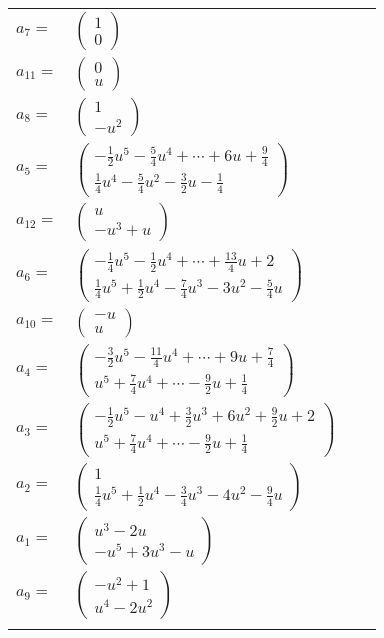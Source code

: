 \documentclass[1p]{elsarticle_modified}
\theoremstyle{definition}
\begin{document}
\begin{tabular}{m{7pt} m{180pt} m{7pt} m{180pt} }
\flushright $a_{7}=$&$\begin{pmatrix}1\\0\end{pmatrix}$ \\
\flushright $a_{11}=$&$\begin{pmatrix}0\\u\end{pmatrix}$ \\
\flushright $a_{8}=$&$\begin{pmatrix}1\\- u^2\end{pmatrix}$ \\
\flushright $a_{5}=$&$\begin{pmatrix}-\frac{1}{2} u^5-\frac{5}{4} u^4+\cdots+6 u+\frac{9}{4}\\\frac{1}{4} u^4-\frac{5}{4} u^2-\frac{3}{2} u-\frac{1}{4}\end{pmatrix}$ \\
\flushright $a_{12}=$&$\begin{pmatrix}u\\- u^3+u\end{pmatrix}$ \\
\flushright $a_{6}=$&$\begin{pmatrix}-\frac{1}{4} u^5-\frac{1}{2} u^4+\cdots+\frac{13}{4} u+2\\\frac{1}{4} u^5+\frac{1}{2} u^4-\frac{7}{4} u^3-3 u^2-\frac{5}{4} u\end{pmatrix}$ \\
\flushright $a_{10}=$&$\begin{pmatrix}- u\\u\end{pmatrix}$ \\
\flushright $a_{4}=$&$\begin{pmatrix}-\frac{3}{2} u^5-\frac{11}{4} u^4+\cdots+9 u+\frac{7}{4}\\u^5+\frac{7}{4} u^4+\cdots-\frac{9}{2} u+\frac{1}{4}\end{pmatrix}$ \\
\flushright $a_{3}=$&$\begin{pmatrix}-\frac{1}{2} u^5- u^4+\frac{3}{2} u^3+6 u^2+\frac{9}{2} u+2\\u^5+\frac{7}{4} u^4+\cdots-\frac{9}{2} u+\frac{1}{4}\end{pmatrix}$ \\
\flushright $a_{2}=$&$\begin{pmatrix}1\\\frac{1}{4} u^5+\frac{1}{2} u^4-\frac{3}{4} u^3-4 u^2-\frac{9}{4} u\end{pmatrix}$ \\
\flushright $a_{1}=$&$\begin{pmatrix}u^3-2 u\\- u^5+3 u^3- u\end{pmatrix}$ \\
\flushright $a_{9}=$&$\begin{pmatrix}- u^2+1\\u^4-2 u^2\end{pmatrix}$\\&\end{tabular}
\end{document}

